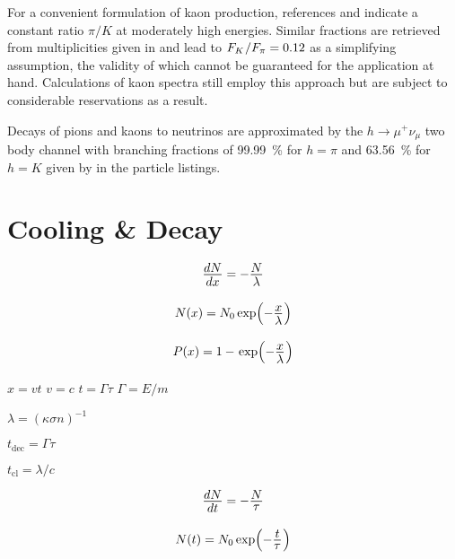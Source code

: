 For a convenient formulation of kaon production, references \cite{Lykasov_2021} and \cite{Lykasov_2022} indicate a constant ratio
$\pi / K$ at moderately high energies. Similar fractions are retrieved from multiplicities given in \cite{Koers_2006} and lead to
$F_K \kern+0.5pt / F_\pi = \num{0.12}$ as a simplifying assumption, the validity of which cannot be guaranteed for the application
at hand. Calculations of kaon spectra still employ this approach but are subject to considerable reservations as a result.

Decays of pions and kaons to neutrinos are approximated by the $h \rightarrow \mu^+ \nu_\mu$ two body channel with branching
fractions of \qty{99.99}{\percent} for $h = \pi$ and \qty{63.56}{\percent} for $h = K$ given by \cite{pdg} in the particle listings.



\section{Cooling \& Decay}
\label{sec:cooling}

\begin{equation*}
	\frac{\raisebox{-0.5ex}{$dN$}}{\raisebox{0.5ex}{$dx$}} = -\frac{\raisebox{-0.5ex}{$N$}}{\raisebox{0.5ex}{$\lambda$}}
\end{equation*}

\begin{equation*}
	N(x) = N_0 \exp \Bigl( -\frac{\raisebox{-0.5ex}{$x$}}{\raisebox{0.5ex}{$\lambda$}} \kern+0.5pt \Bigr)
\end{equation*}

\begin{equation*}
	P(x) = 1 - \kern+1.0pt \exp \Bigl( -\frac{\raisebox{-0.5ex}{$x$}}{\raisebox{0.5ex}{$\lambda$}} \kern+0.5pt \Bigr)
\end{equation*}

$x = vt$ $v = c$ $t = \Gamma\tau$ $\Gamma = E / m$

$\lambda = (\kappa \sigma n)^{-1}$

$t_\text{dec} = \Gamma\tau$

$t_\text{cl} = \lambda / c$

\begin{equation*}
	\frac{\raisebox{-0.5ex}{$dN$}}{\raisebox{0.5ex}{$dt$}} = -\frac{\raisebox{-0.5ex}{$N$}}{\raisebox{0.5ex}{$\tau$}}
\end{equation*}

\begin{equation*}
	N(t) = N_0 \exp \Bigl( -\frac{\raisebox{-0.5ex}{$t$}}{\raisebox{0.5ex}{$\tau$}} \kern+0.5pt \Bigr)
\end{equation*}

